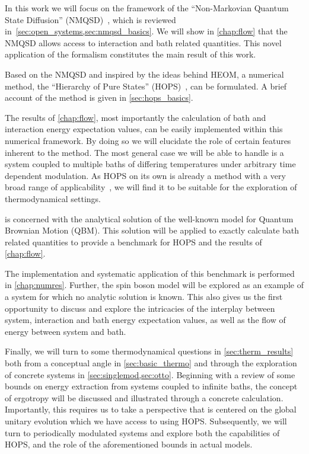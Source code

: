 
In this work we will focus on the framework of the ``Non-Markovian
Quantum State Diffusion'' (NMQSD)~\cite{Diosi1998Mar}, which is
reviewed in~\cref{sec:open_systems,sec:nmqsd_basics}. We will show in
\cref{chap:flow} that the NMQSD allows access to interaction and bath
related quantities. This novel application of the formalism
constitutes the main result of this work.

Based on the NMQSD and inspired by the ideas behind HEOM, a numerical
method, the ``Hierarchy of Pure States''
(HOPS)~\cite{RichardDiss,Hartmann2017Dec}, can be formulated. A brief
account of the method is given in \cref{sec:hops_basics}.

The results of \cref{chap:flow}, most importantly the calculation of
bath and interaction energy expectation values, can be easily
implemented within this numerical framework. By doing so we will
elucidate the role of certain features inherent to the method. The
most general case we will be able to handle is a system coupled to
multiple baths of differing temperatures under arbitrary time
dependent modulation. As HOPS on its own is already a method with a
very broad range of applicability~\cite{RichardDiss}, we will find it
to be suitable for the exploration of thermodynamical settings.

 is concerned with the analytical solution of the
well-known model for Quantum Brownian Motion (QBM). This solution will
be applied to exactly calculate bath related quantities to provide a
benchmark for HOPS and the results of \cref{chap:flow}.

The implementation and systematic application of this benchmark is
performed in \cref{chap:numres}. Further, the spin boson model will be
explored as an example of a system for which no analytic solution is
known. This also gives us the first opportunity to discuss and explore
the intricacies of the interplay between system, interaction and bath
energy expectation values, as well as the flow of energy between
system and bath.

Finally, we will turn to some thermodynamical questions in
\cref{sec:therm_results} both from a conceptual angle in
\cref{sec:basic_thermo} and through the exploration of concrete
systems in \cref{sec:singlemod,sec:otto}. Beginning with a review of
some bounds on energy extraction from systems coupled to infinite
baths, the concept of ergotropy will be discussed and illustrated
through a concrete calculation. Importantly, this requires us to take
a perspective that is centered on the global unitary evolution which
we have access to using HOPS. Subsequently, we will turn to
periodically modulated systems and explore both the capabilities of
HOPS, and the role of the aforementioned bounds in actual models.

